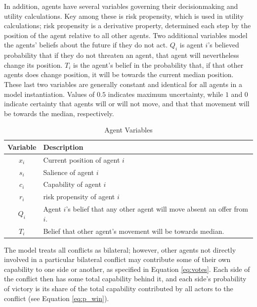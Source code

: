 In addition, agents have several variables governing their decisionmaking and utility calculations. Key among these is risk propensity, which is used in utility calculations; risk propensity is a derivative property, determined each step by the position of the agent relative to all other agents. Two additional variables model the agents' beliefs about the future if they do not act. $Q_i$ is agent $i$'s believed probability that if they do not threaten an agent, that agent will nevertheless change its position. $T_i$ is the agent's belief in the probability that, if that other agents does change position, it will be towards the current median position. These last two variables are generally constant and identical for all agents in a model instantiation. Values of $0.5$ indicates maximum uncertainty, while $1$ and $0$ indicate certainty that agents will or will not move, and that that movement will be towards the median, respectively.

\begin{table}
\centering
\caption{Agent Variables}
\label{table:model_vars}
\begin{tabular}{cl}
    \hline
    Variable &  Description \\
    \hline
    $x_i$       &        Current position of agent $i$  \\
    $s_i$       &        Salience of agent $i$          \\
    $c_i$       &        Capability of agent $i$        \\
    \hline
    $r_i$       &        risk propensity of agent $i$  \\
    $Q_i$       &   Agent $i$'s belief that any other agent will move absent an offer from $i$. \\
    $T_i$       & Belief that other agent's movement will be towards median. \\
    \hline
\end{tabular}
\tableSpace
\end{table}


The model treats all conflicts as bilateral; however, other agents not directly involved in a particular bilateral conflict may contribute some of their own capability to one side or another, as specified in Equation \ref{eq:votes}. Each side of the conflict then has some total capability behind it, and each side's probability of victory is its share of the total capability contributed by all actors to the conflict (see Equation \ref{eq:p_win}). 

